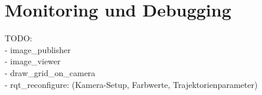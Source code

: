 \section{Monitoring und Debugging}

TODO:\\
- image\_publisher\\
- image\_viewer\\
- draw\_grid\_on\_camera\\
- rqt\_reconfigure: (Kamera-Setup, Farbwerte, Trajektorienparameter)\\